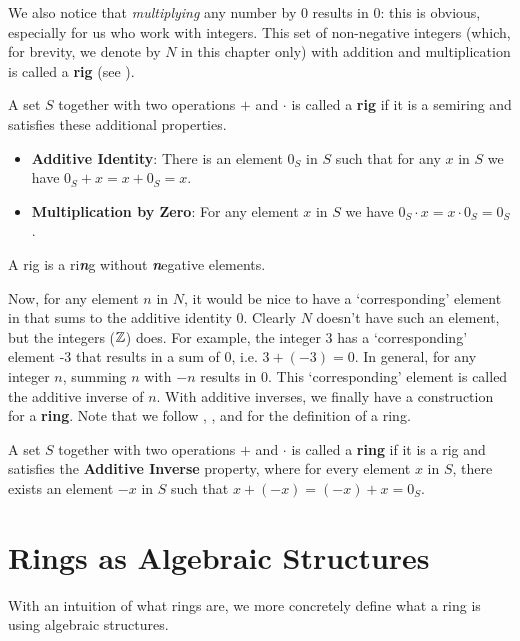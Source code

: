 We also notice that \textit{multiplying} any number by 0 results in 0: this is obvious, especially for us who work with integers. This set of non-negative integers (which, for brevity, we denote by $N$ in this chapter only) with addition and multiplication is called a \textbf{rig} (see \cite{proofwiki_rig-definition}).
\begin{definition}
    A set $S$ together with two operations $+$ and $\cdot$ is called a \textbf{rig} if it is a semiring and satisfies these additional properties.
    \begin{itemize}
        \item \textbf{Additive Identity}: There is an element $0_S$ in $S$ such that for any $x$ in $S$ we have $0_S + x = x + 0_S = x$.
        \item \textbf{Multiplication by Zero}: For any element $x$ in $S$ we have $0_S \cdot x = x \cdot 0_S = 0_S$.
    \end{itemize}
\end{definition}
\begin{remark}
    A rig is a ri\textit{\textbf{n}}g without \textit{\textbf{n}}egative elements.
\end{remark}

Now, for any element $n$ in $N$, it would be nice to have a `corresponding' element in that sums to the additive identity 0. Clearly $N$ doesn't have such an element, but the integers ($\mathbb{Z}$) does. For example, the integer 3 has a `corresponding' element -3 that results in a sum of 0, i.e. $3 + (-3) = 0$. In general, for any integer $n$, summing $n$ with $-n$ results in 0. This `corresponding' element is called the additive inverse of $n$. With additive inverses, we finally have a construction for a \textbf{ring}. Note that we follow \cite[p.~223]{dummit_foote_2004}, \cite[p.~115, Definition 1.1]{hungerford_1980}, and \cite{proofwiki_ring-definition} for the definition of a ring.
\begin{definition}
    A set $S$ together with two operations $+$ and $\cdot$ is called a \textbf{ring} if it is a rig and satisfies the \textbf{Additive Inverse} property, where for every element $x$ in $S$, there exists an element $-x$ in $S$ such that $x + (-x) = (-x) + x = 0_S$.
\end{definition}

\section{Rings as Algebraic Structures}
With an intuition of what rings are, we more concretely define what a ring is using algebraic structures.

